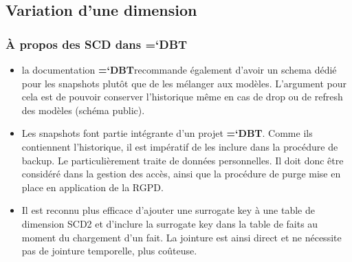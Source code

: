\documentclass[11pt]{article}
\newcommand{\techno}[1]{{\ttfamily\bfseries\hyphenchar\font=`\-\color{Sienna}#1}}
\newcommand{\datatable}[1]{\tcbox{\ttfamily\hyphenchar\font=`\-\color{tablecolor}#1}}
\newcommand{\dbt}{\techno{DBT}}
\begin{document}
\subsection{Variation d'une dimension}

\subsubsection*{À propos des SCD dans \dbt} \label{ann:scd_dbt_aller_plus_loin}

\begin{itemize}
    \item la documentation \dbt recommande également d'avoir un schema dédié pour les snapshots plutôt que de les mélanger aux modèles. L'argument pour cela est de pouvoir conserver l'historique même en cas de drop ou de refresh des modèles (schéma public).
    \item Les snapshots font partie intégrante d'un projet \dbt. Comme ils contiennent l'historique, il est impératif de les inclure dans la procédure de backup. Le \datatable{scd\_client} particulièrement traite de données personnelles. Il doit donc être considéré dans la gestion des accès, ainsi que la procédure de purge mise en place en application de la RGPD.
    \item Il est reconnu plus efficace d'ajouter une surrogate key à une table de dimension SCD2 et d'inclure la surrogate key dans la table de faits au moment du chargement d'un fait. La jointure est ainsi direct et ne nécessite pas de jointure temporelle, plus coûteuse.
\end{itemize}
\end{document}
